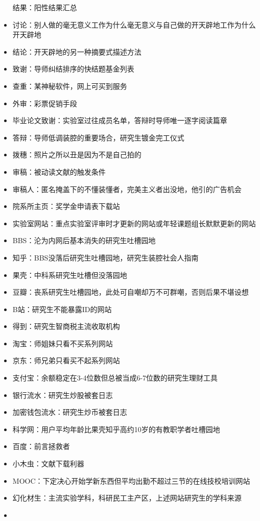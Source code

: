 \documentclass[]{tufte-book}
\begin{document}
\begin{itemize}
  结果：阳性结果汇总
\item
  讨论：别人做的毫无意义工作为什么毫无意义与自己做的开天辟地工作为什么开天辟地
\item
  结论：开天辟地的另一种摘要式描述方法
\item
  致谢：导师纠结排序的快结题基金列表
\item
  查重：某神秘软件，网上可买到服务
\item
  外审：彩票促销手段
\item
  毕业论文致谢：实验室过往成员名单，答辩时导师唯一逐字阅读篇章
\item
  答辩：导师低调装腔的重要场合，研究生镀金完工仪式
\item
  拨穗：照片之所以丑是因为不是自己拍的
\item
  审稿：被动读文献的触发条件
\item
  审稿人：匿名掩盖下的不懂装懂者，完美主义者出没地，他引的广告机会
\item
  院系所主页：奖学金申请表下载站
\item
  实验室网站：重点实验室评审时才更新的网站或年轻课题组长默默更新的网站
\item
  BBS：沦为内网后基本消失的研究生吐槽园地
\item
  知乎：BBS没落后研究生吐槽园地，研究生装腔社会人指南
\item
  果壳：中科系研究生吐槽但没落园地
\item
  豆瓣：丧系研究生吐槽园地，此处可自嘲却万不可群嘲，否则后果不堪设想
\item
  B站：研究生不能暴露ID的网站
\item
  得到：研究生智商税主流收取机构
\item
  淘宝：师姐妹只看不买系列网站
\item
  京东：师兄弟只看买不起系列网站
\item
  支付宝：余额稳定在3-4位数但总被当成6-7位数的研究生理财工具
\item
  银行流水：研究生炒股被套日志
\item
  加密钱包流水：研究生炒币被套日志
\item
  科学网：用户平均年龄比果壳知乎高约10岁的有教职学者吐槽园地
\item
  百度：前言拯救者
\item
  小木虫：文献下载利器
\item
  MOOC：下定决心开始学新东西但平均出勤不超过三节的在线技校培训网站
\item
  幻化材生：主流实验学科，科研民工主产区，上述网站研究生的学科来源
\item

\end{itemize}
\end{document}
